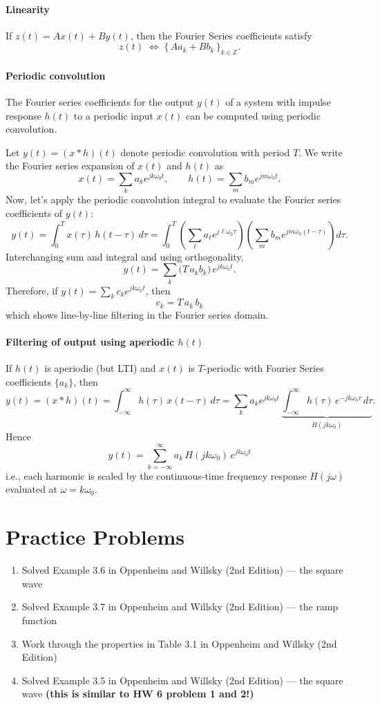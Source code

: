 \documentclass{ee102_notes}
\begin{document}
\paragraph{Linearity}

If $z(t)=A x(t)+B y(t)$, then the Fourier Series coefficients satisfy
\[
z(t)\;\Longleftrightarrow\; \{\,A a_k + B b_k\,\}_{k\in\mathbb{Z}}.
\]

\paragraph{Periodic convolution}
The Fourier series coefficients for the output $y(t)$ of a system with impulse response $h(t)$ to a periodic input $x(t)$ can be computed using periodic convolution.

Let $y(t)=(x*h)(t)$ denote periodic convolution with period $T$.
We write the Fourier series expansion of $x(t)$ and $h(t)$ as
\[
x(t)=\sum_{k} a_k e^{jk\omega_0 t},\qquad 
h(t)=\sum_{m} b_m e^{jm\omega_0 t}.
\]
Now, let's apply the periodic convolution integral to evaluate the Fourier series coefficients of $y(t)$:
\[
y(t)=\int_{0}^{T} x(\tau)\,h(t-\tau)\,d\tau
=\int_{0}^{T}\left(\sum_{\ell} a_\ell e^{j\ell\omega_0 \tau}\right)
\left(\sum_{m} b_m e^{jm\omega_0 (t-\tau)}\right)d\tau.
\]
Interchanging sum and integral and using orthogonality,
\[
y(t)= \sum_{k} \Big(T\,a_k b_k\Big)\,e^{jk\omega_0 t}.
\]
Therefore, if $y(t)=\sum_k c_k e^{jk\omega_0 t}$, then
\[
\,c_k = T\,a_k\,b_k\,
\]
which shows line-by-line filtering in the Fourier series domain.

\paragraph{Filtering of output using aperiodic $h(t)$}

If $h(t)$ is aperiodic (but LTI) and $x(t)$ is $T$-periodic with Fourier Series coefficients $\{a_k\}$, then
\[
y(t)=(x*h)(t)=\int_{-\infty}^{\infty} h(\tau)\,x(t-\tau)\,d\tau
= \sum_{k} a_k e^{jk\omega_0 t}\,\underbrace{\int_{-\infty}^{\infty} h(\tau)\,e^{-jk\omega_0 \tau}\,d\tau}_{\displaystyle H(jk\omega_0)}.
\]
Hence
\[
\,y(t)=\sum_{k=-\infty}^{\infty} a_k\,H(jk\omega_0)\,e^{jk\omega_0 t}\,
\]
i.e., each harmonic is scaled by the continuous-time frequency response $H(j\omega)$ evaluated at $\omega= k\omega_0$.

\section{Practice Problems}
\begin{enumerate}
    \item Solved Example 3.6 in Oppenheim and Willsky (2nd Edition) --- the square wave
    \item Solved Example 3.7 in Oppenheim and Willsky (2nd Edition) --- the ramp function
    \item Work through the properties in Table 3.1 in Oppenheim and Willsky (2nd Edition)
    \item Solved Example 3.5 in Oppenheim and Willsky (2nd Edition) --- the square wave \textbf{(this is similar to HW 6 problem 1 and 2!)}
\end{enumerate}
\end{document}
